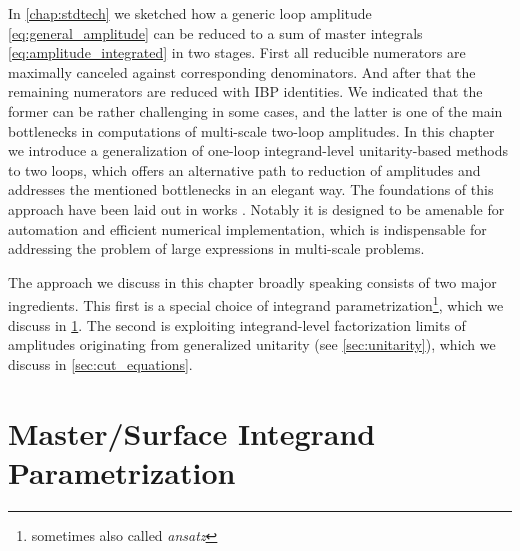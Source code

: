 In \cref{chap:stdtech} we sketched how a generic loop amplitude \eqref{eq:general_amplitude} can be reduced
to a sum of master integrals \eqref{eq:amplitude_integrated} in two stages.
First all reducible numerators are maximally canceled against corresponding denominators.
And after that the remaining numerators are reduced with IBP identities.
We indicated that the former can be rather challenging in some cases,
and the latter is one of the main bottlenecks in computations of
multi-scale two-loop amplitudes.
In this chapter we introduce a generalization of one-loop integrand-level unitarity-based methods \cite{Ossola:2006us,Giele:2008ve,Ellis:2008ir}
to two loops, which offers an alternative path to reduction of amplitudes and addresses the mentioned bottlenecks in an elegant way.
The foundations of this approach have been laid out in works \cite{Ita:2015tya,Abreu:2017xsl,Abreu:2017hqn,Abreu:2017idw}.
Notably it is designed to be amenable for automation and efficient numerical implementation, which is indispensable
for addressing the problem of large expressions in multi-scale problems.


The approach we discuss in this chapter broadly speaking consists of two major ingredients.
This first is a special choice of integrand parametrization\footnote{sometimes also called \emph{ansatz}},
which we discuss in \cref{sec:ansatz_integrand}.
The second is exploiting integrand-level factorization limits of amplitudes originating from generalized unitarity (see \cref{sec:unitarity}),
which we discuss in \cref{sec:cut_equations}.





\section{Master/Surface Integrand Parametrization}
\label{sec:ansatz_integrand}

